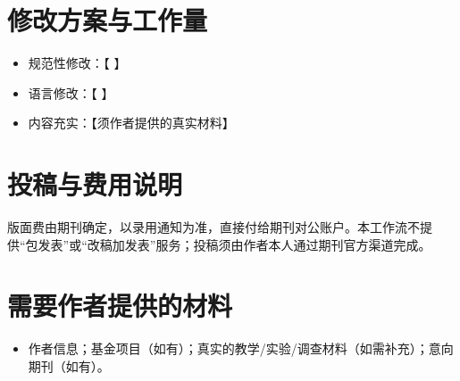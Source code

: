 \documentclass[11pt,a4paper]{ctexart}
\begin{document}
\section{修改方案与工作量}
\begin{itemize}
\item 规范性修改：【 】
\item 语言修改：【 】
\item 内容充实：【须作者提供的真实材料】
\end{itemize}

\section{投稿与费用说明}
版面费由期刊确定，以录用通知为准，直接付给期刊对公账户。本工作流不提供“包发表”或“改稿加发表”服务；投稿须由作者本人通过期刊官方渠道完成。

\section{需要作者提供的材料}
\begin{itemize}
\item 作者信息；基金项目（如有）；真实的教学/实验/调查材料（如需补充）；意向期刊（如有）。
\end{itemize}
\end{document}
